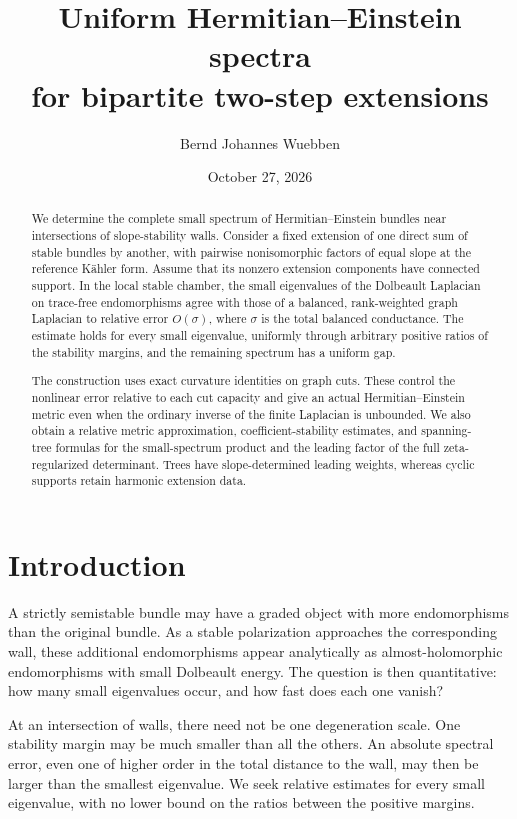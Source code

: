 \documentclass[11pt]{amsart}
\title[Uniform spectra near stability walls]{Uniform Hermitian--Einstein spectra\\for bipartite two-step extensions}
\author{Bernd Johannes Wuebben}
\date{October 27, 2026}
\theoremstyle{definition}
\theoremstyle{remark}
\begin{document}
\begin{abstract}
We determine the complete small spectrum of Hermitian--Einstein bundles
near intersections of slope-stability walls. Consider a fixed extension of
one direct sum of stable bundles by another, with pairwise nonisomorphic
factors of equal slope at the reference Kähler form. Assume that its
nonzero extension components have connected support. In the local stable
chamber, the small eigenvalues of the Dolbeault Laplacian on trace-free
endomorphisms agree with those of a balanced, rank-weighted graph
Laplacian to relative error \(O(\sigma)\), where \(\sigma\) is the total
balanced conductance. The estimate holds for every small eigenvalue,
uniformly through arbitrary positive ratios of the stability margins,
and the remaining spectrum has a uniform gap.

The construction uses exact curvature identities on graph cuts. These
control the nonlinear error relative to each cut capacity and give an
actual Hermitian--Einstein metric even when the ordinary inverse of the
finite Laplacian is unbounded. We also obtain a relative metric
approximation, coefficient-stability estimates, and spanning-tree
formulas for the small-spectrum product and the leading factor of
the full zeta-regularized determinant. Trees have
slope-determined leading weights, whereas cyclic supports retain
harmonic extension data.
\end{abstract}
\maketitle
\enlargethispage{5pt}


\section{Introduction}\label{sec01:introduction}

A strictly semistable bundle may have a graded object with more
endomorphisms than the original bundle. As a stable polarization
approaches the corresponding wall, these additional endomorphisms
appear analytically as almost-holomorphic endomorphisms with small
Dolbeault energy. The question is then quantitative: how many small
eigenvalues occur, and how fast does each one vanish?

At an intersection of walls, there need not be one degeneration scale.
One stability margin may be much smaller than all the others. An
absolute spectral error, even one of higher order in the total
distance to the wall, may then be larger than the smallest eigenvalue.
We seek relative estimates for every small eigenvalue, with no lower
bound on the ratios between the positive margins.
\end{document}
